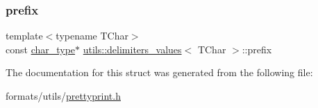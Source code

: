 \mbox{\label{structutils_1_1delimiters__values_ac07bd7e6fe8d3e8fff13c5e6568f1b18}} 
\subsubsection{\texorpdfstring{prefix}{prefix}}
{\footnotesize\ttfamily template$<$typename T\+Char$>$ \\
const \mbox{\hyperlink{structutils_1_1delimiters__values_a57c630ca7c7819e86921e6404a9dd242}{char\+\_\+type}}$\ast$ \mbox{\hyperlink{structutils_1_1delimiters__values}{utils\+::delimiters\+\_\+values}}$<$ T\+Char $>$\+::prefix}



The documentation for this struct was generated from the following file\+:\begin{DoxyCompactItemize}
\item 
formats/utils/\mbox{\hyperlink{prettyprint_8h}{prettyprint.\+h}}\end{DoxyCompactItemize}
